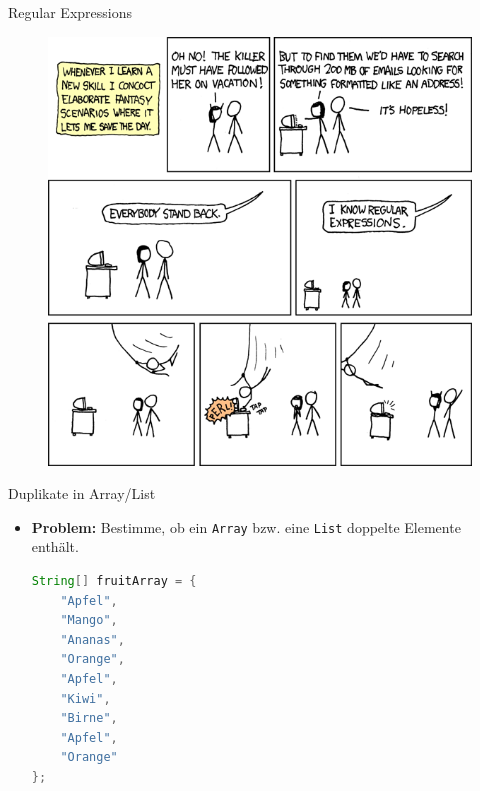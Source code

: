 \documentclass[18pt]{beamer}
\begin{document}
\begin{frame}{Regular Expressions}
    \begin{figure}
        \includegraphics[scale=.3]{img/regular_expressions.png}
    \end{figure}
\end{frame}



\begin{frame}[fragile]{Duplikate in Array/List}
    \begin{itemize}
        \item \textbf{Problem:} Bestimme, ob ein \texttt{Array} bzw. eine \texttt{List} doppelte Elemente enthält.
        \vspace{.2in}
    \begin{lstlisting}[language=Java,basicstyle=\scriptsize]
String[] fruitArray = {
    "Apfel",
    "Mango",
    "Ananas",
    "Orange",
    "Apfel",
    "Kiwi",
    "Birne",
    "Apfel",
    "Orange"
};
    \end{lstlisting}

    \end{itemize}

\end{frame}
\end{document}
